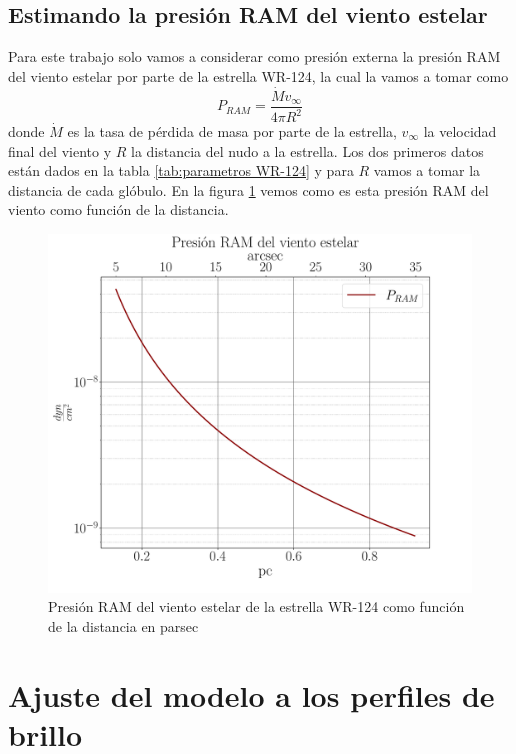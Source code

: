 \documentclass{book}
\begin{document}
\section{Estimando la presión RAM del viento estelar}

Para este trabajo solo vamos a considerar como presión externa la presión RAM del viento estelar por parte de la estrella WR-124, la cual la vamos a tomar como \[P_{RAM}= \frac{\dot{M}v_\infty}{4\pi R^2}\] donde $\dot{M}$ es la tasa de pérdida de masa por parte de la estrella, $v_\infty$ la velocidad final del viento y $R$ la distancia del nudo a la estrella. Los dos primeros datos están dados en la tabla \ref{tab:parametros WR-124} y para $R$ vamos a tomar la distancia de cada glóbulo. En la figura \ref{P_RAM} vemos como es esta presión RAM del viento como función de la distancia.

\begin{figure}[htb]
    \centering    \includegraphics[width=\textwidth]{Nuevas imagenes finales/PRAMcgs.pdf}
    \caption{Presión RAM del viento estelar de la estrella WR-124 como función de la distancia en parsec}
    \label{P_RAM}
\end{figure}

\chapter{Ajuste del modelo a los perfiles de brillo}\label{Chapter : Ajuste}
\end{document}
